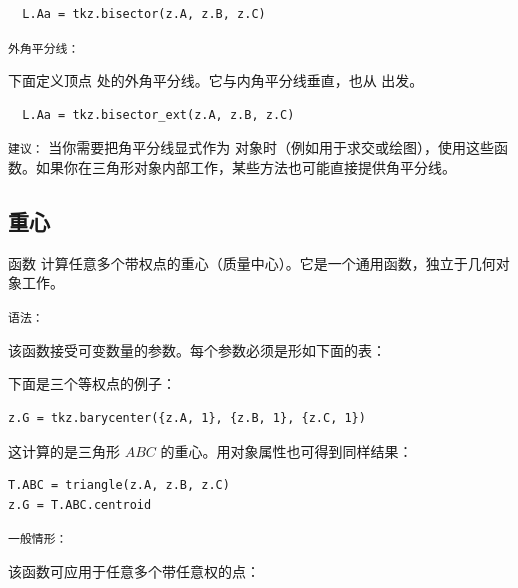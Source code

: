 \begin{mybox}
\begin{verbatim}
  L.Aa = tkz.bisector(z.A, z.B, z.C)
\end{verbatim}
\end{mybox}

\medskip
\texttt{外角平分线：}

下面定义顶点  处的外角平分线。它与内角平分线垂直，也从  出发。

\begin{mybox}
\begin{verbatim}
  L.Aa = tkz.bisector_ext(z.A, z.B, z.C)
\end{verbatim}
\end{mybox}

\medskip
\texttt{建议：}
当你需要把角平分线显式作为  对象时（例如用于求交或绘图），使用这些函数。如果你在三角形对象内部工作，某些方法也可能直接提供角平分线。

\subsection{重心}
\label{sub:misc_barycenter}

函数  计算任意多个带权点的重心（质量中心）。它是一个通用函数，独立于几何对象工作。

\medskip
\texttt{语法：}

该函数接受可变数量的参数。每个参数必须是形如下面的表：

\begin{center}
\end{center}


下面是三个等权点的例子：
\begin{mybox}
\begin{verbatim}
z.G = tkz.barycenter({z.A, 1}, {z.B, 1}, {z.C, 1})
\end{verbatim}
\end{mybox}

这计算的是三角形 $ABC$ 的重心。用对象属性也可得到同样结果：

\begin{mybox}
\begin{verbatim}
T.ABC = triangle(z.A, z.B, z.C)
z.G = T.ABC.centroid
\end{verbatim}
\end{mybox}

\medskip
\texttt{一般情形：}

该函数可应用于任意多个带任意权的点：

